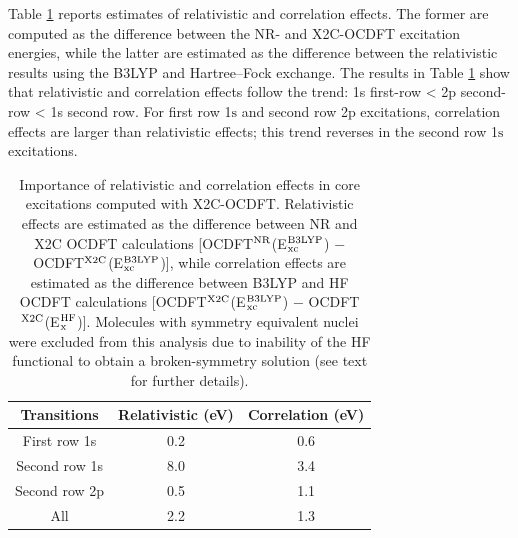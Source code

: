 \documentclass{article}
\begin{document}
Table \ref{table:CorrRel} reports estimates of relativistic and correlation effects.  The former are computed as the difference between the NR- and X2C-OCDFT excitation energies, while the latter are estimated as the difference between the relativistic results using the B3LYP and Hartree--Fock exchange.
The results in Table \ref{table:CorrRel} show that relativistic and correlation effects follow the trend: 1s first-row < 2p second-row < 1s second row.  For first row 1$\text{s}$ and second row 2$\text{p}$ excitations, correlation effects are larger than relativistic effects; this trend reverses in the second row 1$\text{s}$ excitations.

\begin{table}[t!]
\caption{Importance of relativistic and correlation effects in core excitations computed with X2C-OCDFT.  Relativistic effects are estimated as the difference between NR and X2C OCDFT calculations [OCDFT$^{\rm NR}$(E$^{\text{B3LYP}}_{\rm xc}$) $-$ OCDFT$^{\rm X2C}$(E$^{\text{B3LYP}}_{\rm xc}$)], while correlation effects are estimated as the difference between B3LYP and HF OCDFT calculations [OCDFT$^{\rm X2C}$(E$^{\text{B3LYP}}_{\rm xc}$) $-$ OCDFT$^{\rm X2C}$(E$^{\text{HF}}_{\rm x}$)]. Molecules with symmetry equivalent nuclei were excluded from this analysis due to inability of the HF functional to obtain a broken-symmetry solution (see text for further details).}
\begin{tabular}{ccc}
\toprule
Transitions & Relativistic (eV) & Correlation (eV) \\
\midrule
First row 1s & 0.2 & 0.6 \\
Second row 1s & 8.0 & 3.4 \\
Second row 2p & 0.5 & 1.1 \\
All & 2.2 & 1.3 \\
\bottomrule
\end{tabular}
\label{table:CorrRel}
\end{table}
\end{document}
